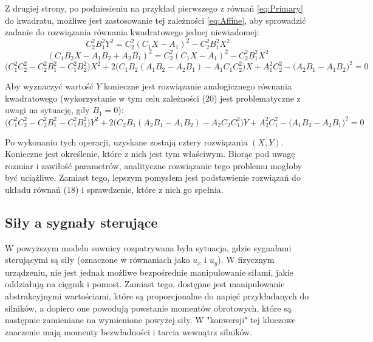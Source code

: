 \documentclass[10pt]{article}
\begin{document}
Z drugiej strony, po podniesieniu na przykład pierwszego z równań \eqref{eq:Primary} do kwadratu, możliwe jest zastosowanie tej zależności \eqref{eq:Affine}, aby sprowadzić zadanie do rozwiązania równania kwadratowego jednej niewiadomej:
\begin{equation}
C_2^2 B_1^2 Y^2 = C_2^2 (C_1 X - A_1)^2 - C_2^2 B_1^2 X^2
\end{equation}
\begin{equation}
(C_1 B_2 X - A_1 B_2 + A_2 B_1)^2 = C_2^2 (C_1 X - A_1)^2 - C_2^2 B_1^2 X^2
\end{equation}
\begin{equation}
\big(C_1^2 C_2^2 - C_2^2 B_1^2 - C_1^2 B_2^2 \big) X^2 + 
2\big(C_1B_2 (A_1B_2 - A_2B_1) - A_1C_1C_2^2 \big) X +
A_1^2 C_2^2 - \big(A_2B_1 - A_1B_2 \big)^2
 = 0
\end{equation}

\newpage
Aby wyznaczyć wartość $Y$ konieczne jest rozwiązanie analogicznego równania kwadratowego (wykorzystanie w tym celu zależności (20) jest problematyczne z uwagi na sytuację, gdy $B_1 = 0$):
\begin{equation}
\big(C_1^2 C_2^2 - C_2^2 B_1^2 - C_1^2 B_2^2 \big) Y^2 + 
2\big(C_2B_1 (A_2B_1 - A_1B_2) - A_2C_2C_1^2 \big) Y +
A_2^2 C_1^2 - \big(A_1B_2 - A_2B_1 \big)^2
 = 0
\end{equation}

Po wykonaniu tych operacji, uzyskane zostają cztery rozwiązania $(X,Y)$. Konieczne jest określenie, które z nich jest tym właściwym. Biorąc pod uwagę rozmiar i zawiłość parametrów, analityczne rozwiązanie tego problemu mogłoby być uciążliwe. Zamiast tego, lepszym pomysłem jest podstawienie rozwiązań do układu równań (18) i sprawdzenie, które z nich go spełnia.

\subsection*{Siły a sygnały sterujące}
W powyższym modelu suwnicy rozpatrywana była sytuacja, gdzie sygnałami sterującymi są siły (oznaczone w równaniach jako $u_x$ i $u_y$). W fizycznym urządzeniu, nie jest jednak możliwe bezpośrednie manipulowanie siłami, jakie oddziałują na cięgnik i pomost. Zamiast tego, dostępne jest manipulowanie abstrakcyjnymi wartościami, które są proporcjonalne do napięć przykładanych do silników, a dopiero one powodują powstanie momentów obrotowych, które są następnie zamieniane na wymienione powyżej siły. W "konwersji" tej kluczowe znaczenie mają momenty bezwładności i tarcia wewnątrz silników. 
\end{document}
